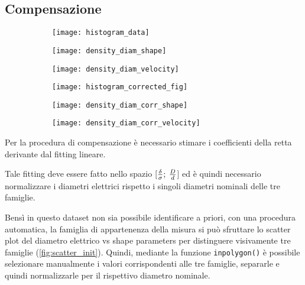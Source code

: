 \subsection{Compensazione}


\begin{figure*}[h!]
	\centering
	\begin{subfigure}{0.33\linewidth}
		\centering
		\texttt{[image: histogram\_data]}
		\caption{}
	\end{subfigure}\hfill
	\begin{subfigure}{0.33\linewidth}
		\centering
		\texttt{[image: density\_diam\_shape]}
		\caption{}
	\end{subfigure}\hfill
	\begin{subfigure}{0.33\linewidth}
		\centering
		\texttt{[image: density\_diam\_velocity]}
		\caption{}
	\end{subfigure}\hfill
	\begin{subfigure}{0.33\linewidth}
		\centering
		\texttt{[image: histogram\_corrected\_fig]}
		\caption{}
	\end{subfigure}\hfill
	\begin{subfigure}{0.33\linewidth}
		\centering
		\texttt{[image: density\_diam\_corr\_shape]}
		\caption{}
	\end{subfigure}\hfill
	\begin{subfigure}{0.33\linewidth}
		\centering
		\texttt{[image: density\_diam\_corr\_velocity]}
		\caption{}
	\end{subfigure}
	\caption{}
	\label{fig:density}
\end{figure*}


Per la procedura di compensazione è necessario stimare i coefficienti della retta derivante dal fitting lineare. 

Tale fitting deve essere fatto nello spazio $[{\delta\over \sigma};\:{D\over d}$] ed è quindi necessario normalizzare i diametri elettrici rispetto i singoli diametri nominali delle tre famiglie. 

Bensì in questo dataset non sia possibile identificare a priori, con una procedura automatica, la famiglia di appartenenza della misura si può sfruttare lo scatter plot del diametro elettrico vs shape parameters per distinguere visivamente tre famiglie (\cref{fig:scatter_init}). Quindi, mediante la funzione \texttt{inpolygon()} è possibile selezionare manualmente i valori corrispondenti alle tre famiglie, separarle e quindi normalizzarle per il rispettivo diametro nominale. 

